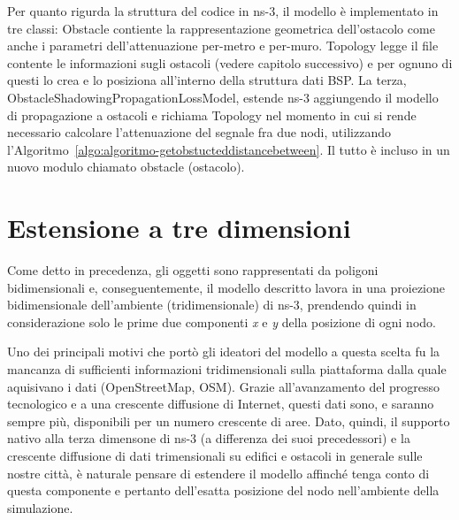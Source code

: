 %
Per quanto rigurda la struttura del codice in ns-3, il modello è implementato in tre classi:
\textsf{Obstacle} contiente la rappresentazione geometrica dell'ostacolo come anche i parametri dell'attenuazione per-metro e per-muro.
\textsf{Topology} legge il file contente le informazioni sugli ostacoli (vedere capitolo successivo) e per ognuno di questi
lo crea e lo posiziona all'interno della struttura dati BSP.
La terza, \textsf{ObstacleShadowingPropagationLossModel}, estende ns-3 aggiungendo il modello di propagazione a ostacoli
e richiama \textsf{Topology} nel momento in cui si rende necessario calcolare l'attenuazione del segnale fra due nodi,
utilizzando l'Algoritmo~\ref{algo:algoritmo-getobstucteddistancebetween}.
Il tutto è incluso in un nuovo modulo chiamato \textsf{obstacle} (ostacolo).
%
\section{Estensione a tre dimensioni}\label{sec:estensione-a-tre-dimensioni}
Come detto in precedenza, gli oggetti sono rappresentati da poligoni bidimensionali e, conseguentemente,
il modello descritto lavora in una proiezione bidimensionale dell'ambiente (tridimensionale) di ns-3,
prendendo quindi in considerazione solo le prime due componenti \textit{x} e \textit{y} della posizione di ogni nodo.

Uno dei principali motivi che portò gli ideatori del modello a questa scelta fu la mancanza di sufficienti informazioni tridimensionali
sulla piattaforma dalla quale aquisivano i dati (OpenStreetMap, OSM).
Grazie all'avanzamento del progresso tecnologico e a una crescente diffusione di Internet, questi dati
sono, e saranno sempre più, disponibili per un numero crescente di aree.
Dato, quindi, il supporto nativo alla terza dimensone di ns-3 (a differenza dei suoi precedessori) e la crescente diffusione
di dati trimensionali su edifici e ostacoli in generale sulle nostre città, è naturale pensare di estendere il modello affinché
tenga conto di questa componente e pertanto dell'esatta posizione del nodo nell'ambiente della simulazione.
%
